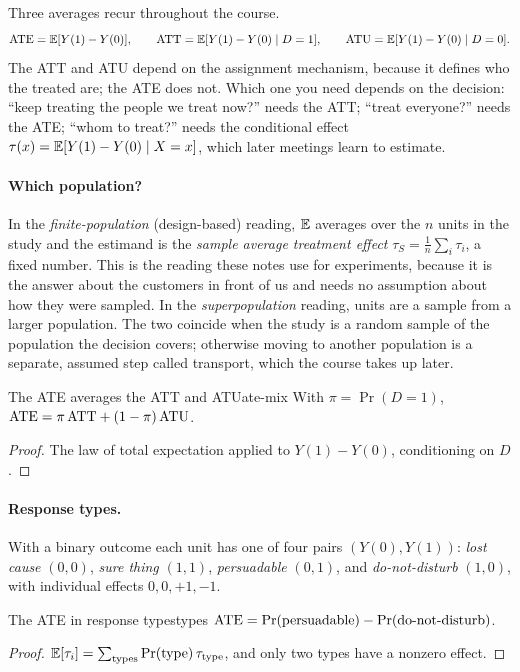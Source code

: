 \documentclass[11pt]{article}
\begin{document}
Three averages recur throughout the course.
\[
  \text{ATE} = \mathbb{E}[Y(1) - Y(0)], \qquad \text{ATT} = \mathbb{E}[Y(1) - Y(0) \mid D = 1], \qquad \text{ATU} = \mathbb{E}[Y(1) - Y(0) \mid D = 0].
\]
The ATT and ATU depend on the assignment mechanism, because it defines who the treated are; the ATE does
not. Which one you need depends on the decision: ``keep treating the people we treat now?'' needs the ATT;
``treat everyone?'' needs the ATE; ``whom to treat?'' needs the conditional effect
$\tau(x) = \mathbb{E}[Y(1) - Y(0) \mid X = x]$, which later meetings learn to estimate.

\paragraph{Which population?} In the \emph{finite-population} (design-based) reading, $\mathbb{E}$ averages over
the $n$ units in the study and the estimand is the \emph{sample average treatment effect}
$\tau_S = \frac1n \sum_i \tau_i$, a fixed number. This is the reading these notes use for experiments,
because it is the answer about the customers in front of us and needs no assumption about how they were
sampled. In the \emph{superpopulation} reading, units are a sample from a larger population. The two
coincide when the study is a random sample of the population the decision covers; otherwise moving to
another population is a separate, assumed step called transport, which the course takes up later.

\begin{prop}{The ATE averages the ATT and ATU}{ate-mix}
With $\pi = \Pr(D=1)$, \quad $\text{ATE} = \pi\,\text{ATT} + (1-\pi)\,\text{ATU}$.
\end{prop}
\begin{proof}
The law of total expectation applied to $Y(1) - Y(0)$, conditioning on $D$.
\end{proof}

\paragraph{Response types.} With a binary outcome each unit has one of four pairs $(Y(0), Y(1))$:
\emph{lost cause} $(0,0)$, \emph{sure thing} $(1,1)$, \emph{persuadable} $(0,1)$, and \emph{do-not-disturb}
$(1,0)$, with individual effects $0, 0, +1, -1$.

\begin{prop}{The ATE in response types}{types}
$\text{ATE} = \Pr(\text{persuadable}) - \Pr(\text{do-not-disturb})$.
\end{prop}
\begin{proof}
$\mathbb{E}[\tau_i] = \sum_{\text{types}} \Pr(\text{type})\,\tau_{\text{type}}$, and only two types have a nonzero
effect.
\end{proof}
\end{document}
